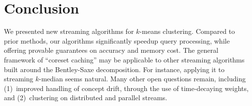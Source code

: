 \section{Conclusion}
\label{sec:concl}
We presented new streaming algorithms for $k$-means clustering.  Compared to
prior methods, our algorithms significantly speedup query processing, while
offering provable guarantees on accuracy and memory cost.  The general framework
of ``coreset caching'' may be applicable to other streaming algorithms built
around the Bentley-Saxe decomposition.  For instance, applying it to streaming
$k$-median seems natural. Many other open questions remain, including
(1)~improved handling of concept drift, through the use of time-decaying
weights, and (2)~clustering on distributed and parallel streams.

